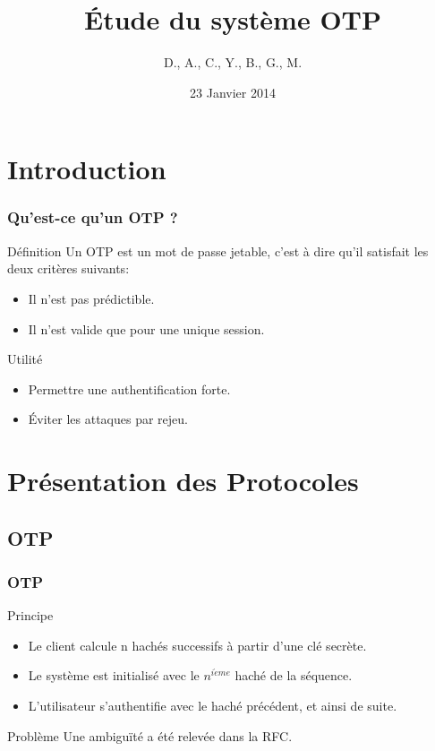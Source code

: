 \documentclass{beamer}
\title{Étude du système OTP}
\author{D.\bsc{Picard}, A.\bsc{Smondack}, C.\bsc{Hardouin}, Y.\bsc{Adegoloye}, B.\bsc{Zigh}, G.\bsc{Ferry}, M.\bsc{Michotte}}
\institute{Université de Rouen}
\date{23 Janvier 2014}
\begin{document}
\begin{frame} 
\titlepage
\end{frame}


\section{Introduction}
\begin{frame}
\frametitle{Qu'est-ce qu'un OTP ?}
\begin{block}{Définition}
    Un OTP est un mot de passe jetable, c'est à dire qu'il satisfait les deux 
  critères suivants:
  \begin{itemize}
    \item Il n'est pas prédictible.
    \item Il n'est valide que pour une unique session.
  \end{itemize}
\end{block}

\begin{block}{Utilité}
  \begin{itemize}
    \item Permettre une authentification forte.
    \item Éviter les attaques par rejeu.
  \end{itemize}
\end{block}
\end{frame}

\section{Présentation des Protocoles}
\subsection{OTP}
\begin{frame}
\frametitle{OTP}
\begin{block}{Principe}
\begin{itemize}
 \item Le client calcule n hachés successifs à partir d'une clé secrète.
 \item Le système est initialisé avec le $n^{i\grave{e}me}$ haché de la séquence.
 \item L'utilisateur s'authentifie avec le haché précédent, et ainsi de suite.
\end{itemize}
\end{block}

\begin{block}{Problème}
Une ambiguïté a été relevée dans la RFC.
\end{block}
\end{frame}
\end{document}
